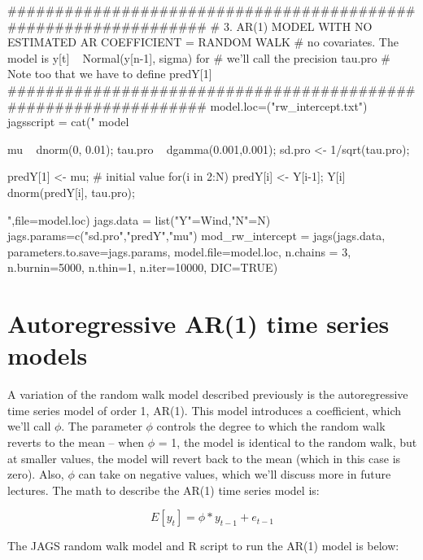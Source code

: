 \begin{Schunk}
\begin{Sinput}
 ################################################################
 # 3. AR(1) MODEL WITH NO ESTIMATED AR COEFFICIENT = RANDOM WALK
 # no covariates. The model is y[t] ~ Normal(y[n-1], sigma) for 
 # we'll call the precision tau.pro 
 # Note too that we have to define predY[1]
 ################################################################
 model.loc=("rw_intercept.txt")
 jagsscript = cat("
 model {  
    mu ~ dnorm(0, 0.01); 
    tau.pro ~ dgamma(0.001,0.001); 
    sd.pro <- 1/sqrt(tau.pro);
 
    predY[1] <- mu; # initial value
    for(i in 2:N) {
       predY[i] <- Y[i-1]; 
       Y[i] ~ dnorm(predY[i], tau.pro);
    }
 }  
 ",file=model.loc)
 jags.data = list("Y"=Wind,"N"=N)
 jags.params=c("sd.pro","predY","mu")
 mod_rw_intercept = jags(jags.data, parameters.to.save=jags.params, model.file=model.loc, 
 n.chains = 3, n.burnin=5000, n.thin=1, n.iter=10000, DIC=TRUE)  
\end{Sinput}
\end{Schunk}


\section{Autoregressive AR(1) time series models}\label{sec:ar1}

A variation of the random walk model described previously is the autoregressive time series model of order 1, AR(1). This model introduces a coefficient, which we'll call $\phi$. The parameter $\phi$ controls the degree to which the random walk reverts to the mean -- when $\phi$ = 1, the model is identical to the random walk, but at smaller values, the model will revert back to the mean (which in this case is zero). Also, $\phi$ can take on negative values, which we'll discuss more in future lectures. The math to describe the AR(1) time series model is:

\begin{equation}
E[{y_t}] = \phi * y_{t-1} + e_{t-1}
\end{equation}

The JAGS random walk model and R script to run the AR(1) model is below:


